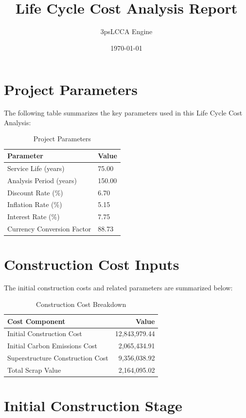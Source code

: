 \documentclass[12pt,a4paper]{article}
\title{Life Cycle Cost Analysis Report}
\author{3psLCCA Engine}
\date{\today}
\begin{document}
\maketitle
\tableofcontents
\newpage

\section{Project Parameters}

The following table summarizes the key parameters used in this Life Cycle Cost Analysis:

\begin{table}[H]
\centering
\begin{tabular}{ll}
\toprule
\textbf{Parameter} & \textbf{Value} \\
\midrule
Service Life (years) & 75.00 \\
Analysis Period (years) & 150.00 \\
Discount Rate (\%) & 6.70 \\
Inflation Rate (\%) & 5.15 \\
Interest Rate (\%) & 7.75 \\
Currency Conversion Factor & 88.73 \\
\bottomrule
\end{tabular}
\caption{Project Parameters}
\end{table}

\section{Construction Cost Inputs}

The initial construction costs and related parameters are summarized below:

\begin{table}[H]
\centering
\begin{tabular}{lr}
\toprule
\textbf{Cost Component} & \textbf{Value} \\
\midrule
Initial Construction Cost & 12,843,979.44 \\
Initial Carbon Emissions Cost & 2,065,434.91 \\
Superstructure Construction Cost & 9,356,038.92 \\
Total Scrap Value & 2,164,095.02 \\
\bottomrule
\end{tabular}
\caption{Construction Cost Breakdown}
\end{table}

\section{Initial Construction Stage}
\end{document}
